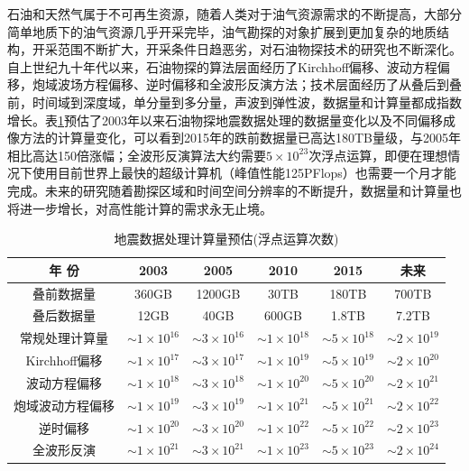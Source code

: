 \documentclass[degree=doctor]{thuthesis}
\begin{document}
石油和天然气属于不可再生资源，随着人类对于油气资源需求的不断提高，大部分简单地质下的油气资源几乎开采完毕，油气勘探的对象扩展到更加复杂的地质结构，开采范围不断扩大，开采条件日趋恶劣，对石油物探技术的研究也不断深化。自上世纪九十年代以来，石油物探的算法层面经历了Kirchhoff偏移\cite{yilmaz2001seismic}、波动方程偏移\cite{rickett2002offset}，炮域波场方程偏移\cite{zhang2005theory}、逆时偏移\cite{baysal1983reverse}和全波形反演方法\cite{tarantola1984inversion}；技术层面经历了从叠后到叠前，时间域到深度域，单分量到多分量，声波到弹性波，数据量和计算量都成指数增长\cite{赵改善2009高性能计算在石油物探中的应用现状与前景}。表\ref{tb:oilcomputing}预估了2003年以来石油物探地震数据处理的数据量变化以及不同偏移成像方法的计算量变化\cite{赵改善2009高性能计算在石油物探中的应用现状与前景}，可以看到2015年的跌前数据量已高达180TB量级，与2005年相比高达150倍涨幅；全波形反演算法大约需要$5\times10^{23}$次浮点运算，即便在理想情况下使用目前世界上最快的超级计算机（峰值性能125PFlops）也需要一个月才能完成。未来的研究随着勘探区域和时间空间分辨率的不断提升，数据量和计算量也将进一步增长，对高性能计算的需求永无止境。

\begin{table}[ht]
\centering
\caption{地震数据处理计算量预估(浮点运算次数)}
\label{tb:oilcomputing}
\begin{tabular}{cccccc}
\hline\hline
年    份      & 2003         & 2005         & 2010         & 2015         & 未来           \\ \hline\hline
叠前数据量       & 360GB        & 1200GB       & 30TB         & 180TB        & 700TB        \\ \hline
叠后数据量       & 12GB         & 40GB         & 600GB        & 1.8TB        & 7.2TB        \\ \hline
常规处理计算量   & $\sim1\times10^{16}$ & $\sim3\times10^{16}$ & $\sim1\times10^{18}$ & $\sim5\times10^{18}$ & $\sim2\times10^{19}$ \\ \hline
Kirchhoff偏移    & $\sim1\times10^{17}$ & $\sim3\times10^{17}$ & $\sim1\times10^{19}$ & $\sim5\times10^{19}$ & $\sim2\times10^{20}$ \\ \hline
波动方程偏移     & $\sim1\times10^{18}$ & $\sim3\times10^{18}$ & $\sim1\times10^{20}$ & $\sim5\times10^{20}$ & $\sim2\times10^{21}$ \\ \hline
炮域波动方程偏移 & $\sim1\times10^{19}$ & $\sim3\times10^{19}$ & $\sim1\times10^{21}$ & $\sim5\times10^{21}$ & $\sim2\times10^{22}$ \\ \hline
逆时偏移         & $\sim1\times10^{20}$ & $\sim3\times10^{20}$ & $\sim1\times10^{22}$ & $\sim5\times10^{22}$ & $\sim2\times10^{23}$ \\ \hline
全波形反演       & $\sim1\times10^{21}$ & $\sim3\times10^{21}$ & $\sim1\times10^{23}$ & $\sim5\times10^{23}$ & $\sim2\times10^{24}$ \\ \hline
\end{tabular}
\end{table}
\end{document}
